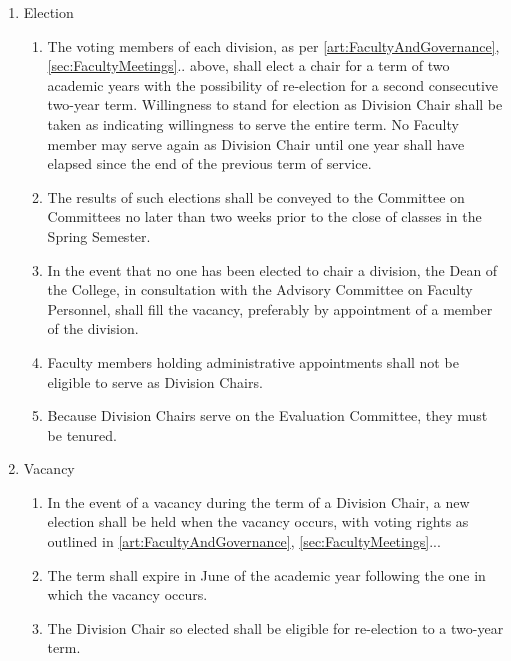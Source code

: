\documentclass{manual}
\newcommand{\itemLevelA}{\alph*.}
\newcommand{\itemLevelB}{\arabic*)}
\newcommand{\itemRefA}{\alph*}
\newcommand{\itemRefB}{\arabic*}
\begin{document}
				\begin{enumerate}[label=\itemLevelA,ref=\itemRefA]
				\item Election

					\begin{enumerate}[label=\itemLevelB,ref=\itemRefB]
					\item The voting members of each division, as per \cref{art:FacultyAndGovernance}, \cref{sec:FacultyMeetings}.. above, shall elect a chair for a term of two academic years with the possibility of re-election for a second consecutive two-year term. Willingness to stand for election as Division Chair shall be taken as indicating willingness to serve the entire term. No Faculty member may serve again as Division Chair until one year shall have elapsed since the end of the previous term of service.
					\item The results of such elections shall be conveyed to the Committee on Committees no later than two weeks prior to the close of classes in the Spring Semester.
					\item In the event that no one has been elected to chair a division, the Dean of the College, in consultation with the Advisory Committee on Faculty Personnel, shall fill the vacancy, preferably by appointment of a member of the division.
					\item Faculty members holding administrative appointments shall not be eligible to serve as Division Chairs.
					\item  Because Division Chairs serve on the Evaluation Committee, they must be tenured.
					\end{enumerate}
				
				\item Vacancy

					\begin{enumerate}[label=\itemLevelB,ref=\itemRefB]
					\item In the event of a vacancy during the term of a Division Chair, a new election shall be held when the vacancy occurs, with voting rights as outlined in \cref{art:FacultyAndGovernance}, \cref{sec:FacultyMeetings}...
					\item The term shall expire in June of the academic year following the one in which the vacancy occurs.
					\item The Division Chair so elected shall be eligible for re-election to a two-year term. 
					\end{enumerate}
				

\end{enumerate}
\end{document}
